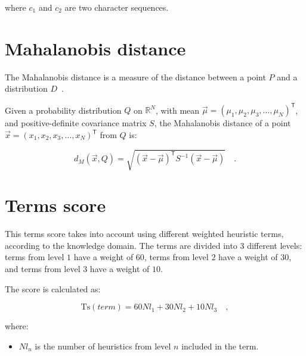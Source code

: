 \documentclass[a4paper, 12pt]{book}
\begin{document}
where $c_{1}$ and $c_{2}$ are two character sequences.

\section{Mahalanobis distance}
\label{sec:mahalanobis-definition}

The Mahalanobis distance is a measure of the distance between a point \(P\) and a distribution \(D\)~\cite{mclachlan1999mahalanobis}.

Given a probability distribution $Q$ on \(\mathbb{R} ^{N}\), with mean $\vec {\mu}=(\mu_{1},\mu_{2},\mu_{3}, \dots, \mu_{N})^{\mathsf {T}}$, and positive-definite covariance matrix $S$, the Mahalanobis distance of a point $\vec {x}=(x_{1},x_{2},x_{3},\dots ,x_{N})^{\mathsf {T}}$ from $Q$ is:

\begin{center}
    \begin{equation}
    d_{M}({\vec {x}},Q)={\sqrt {({\vec {x}}-{\vec {\mu }})^{\mathsf {T}}S^{-1}({\vec {x}}-{\vec {\mu }})}} \quad .
    \end{equation}
\end{center}

\section{Terms score}
\label{sec:terms-score-definition}

This terms score takes into account using different weighted heuristic terms, according to the knowledge domain. The terms are divided into $3$ different levels: terms from level $1$ have a weight of $60$, terms from level $2$ have a weight of $30$, and terms from level $3$ have a weight of $10$. 


The score is calculated as: 

\begin{center}
    \begin{equation}
        \mathrm {Ts}(term) = 60Nl_{1} + 30Nl_{2} + 10Nl_{3}\quad ,
    \end{equation}
\end{center}

where:
\begin{itemize}
    \item $Nl_{n}$ is the number of heuristics from level $n$ included in the term.
\end{itemize}


\printglossary[type=\acronymtype]

\printglossary



\cleardoublepage

\raggedright\printbibliography[heading=bibintoc,title={References}]
\end{document}
